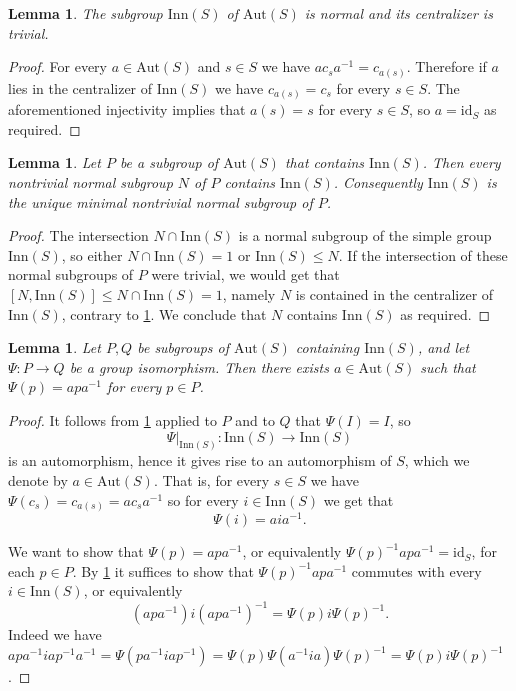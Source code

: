 \documentclass[11pt]{amsart}
\newtheorem{lem}[thm]{Lemma}
\numberwithin{equation}{section}
\begin{document}
\begin{lem} \label{TrivCentInn}
The subgroup $\mathrm{Inn}(S)$ of $\mathrm{Aut}(S)$ is normal and its centralizer is trivial.
\end{lem}

\begin{proof}
For every $a\in \mathrm{Aut}(S)$ and $s\in S$ we have $a c_s a^{-1} = c_{a(s)}$. Therefore if $a$ lies in the centralizer of $\mathrm{Inn}(S)$ we have $c_{a(s)}=c_s$ for every $s \in S$.  The aforementioned injectivity implies that $a(s) = s$ for every $s\in S$, so $a=\mathrm{id}_S$ as required.
\end{proof}

\begin{lem}\label{lem:centralizer-and-minimal-normal}
Let $P$ be a subgroup of $\mathrm{Aut}(S)$ that contains $\mathrm{Inn}(S)$. Then every nontrivial normal subgroup $N$ of $P$ contains $\mathrm{Inn}(S)$. Consequently $\mathrm{Inn}(S)$ is the unique minimal nontrivial normal subgroup of $P$.
\end{lem}

\begin{proof}
The intersection $N \cap \mathrm{Inn}(S)$ is a normal subgroup of the simple group $\mathrm{Inn}(S)$, so either $N \cap \mathrm{Inn}(S) =1$ or $\mathrm{Inn}(S) \leq N$. If the intersection of these normal subgroups of $P$ were trivial, we would get that $[N, \mathrm{Inn}(S)] \leq N \cap \mathrm{Inn}(S) = 1 $, namely $N$ is contained in the centralizer of $\mathrm{Inn}(S)$, contrary to \cref{TrivCentInn}. We conclude that $N$ contains $\mathrm{Inn}(S)$ as required.
\end{proof}

\begin{lem} \label{lem:rigidity}
Let $P,Q$ be subgroups of $\mathrm{Aut}(S)$ containing $\mathrm{Inn}(S)$, and let $\Psi \colon P\xrightarrow{}Q$ be a group isomorphism. Then there exists $a \in \mathrm{Aut}(S)$ such that $\Psi(p)=a p a^{-1}$ for every $p\in P$.
\end{lem}

\begin{proof}
It follows from \cref{lem:centralizer-and-minimal-normal} applied to $P$ and to $Q$ that $\Psi(I)=I$, so
\[ \Psi|_{\mathrm{Inn}(S)} \colon \mathrm{Inn}(S) \xrightarrow{} \mathrm{Inn}(S) \]
is an automorphism, hence it gives rise to an automorphism of $S$, which we denote by $a \in \mathrm{Aut}(S)$. That is, for every $s \in S$ we have $\Psi(c_s)=c_{a(s)}=a c_s a^{-1}$ so for every $i \in \mathrm{Inn}(S)$ we get that
\[ \Psi(i)=aia^{-1}. \]

We want to show that $\Psi(p) = apa^{-1}$, or equivalently $\Psi(p)^{-1} a p a^{-1} = \mathrm{id}_S$, for each $p \in P$. By \cref{TrivCentInn} it suffices to show that $\Psi(p)^{-1} a p a^{-1}$ commutes with every $i \in \mathrm{Inn}(S)$, or equivalently
\[ (a p a^{-1}) i (a p a^{-1})^{-1} = \Psi(p) i \Psi(p)^{-1}. \]
Indeed we have $a p a^{-1} i a p^{-1}a^{-1} = \Psi(p a^{-1} i a p^{-1}) = \Psi(p)\Psi(a^{-1} i a)\Psi(p)^{-1} = \Psi(p) i \Psi(p)^{-1}$.
\end{proof}
\end{document}
